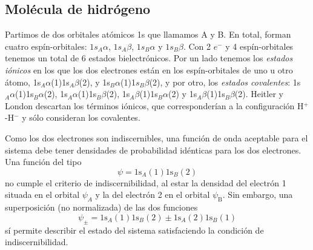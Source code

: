 \subsection{Molécula de hidrógeno}
Partimos de dos orbitales atómicos 1s que llamamos A y B.
En total, forman cuatro espín-orbitales: $1s_A\alpha$, 
$1s_A \beta$, $1s_B\alpha$ y $1s_B \beta$. 
Con 2 $e^-$ y 4 espín-orbitales tenemos un total de 6 estados
bielectrónicos. Por un lado tenemos los \textit{estados 
iónicos} en los que los dos electrones  están en los
espín-orbitales de uno u otro átomo, 
1s$_A\alpha$(1)1s$_A\beta$(2),
y 1s$_B\alpha$(1)1$s_B\beta$(2), 
y por otro, los \textit{estados covalentes}:
1s$_A\alpha$(1)1s$_B\alpha$(2), 1s$_A\alpha$(1)1s$_B\beta$(2), 
1s$_A\beta$(1)1s$_B\alpha$(2) y 1s$_A\beta$(1)1s$_B\beta$(2).
Heitler y London descartan los términos iónicos, que 
corresponderían a la configuración H$^+$-H$^-$ y sólo 
consideran los covalentes.

Como los dos electrones son indiscernibles, una función de onda
aceptable para el sistema debe tener densidades de probabilidad 
idénticas para los dos electrones. Una función del tipo
\begin{equation}
    \psi=\mathrm{1s}_A(1)\mathrm{1s}_B(2)
\end{equation}
no cumple el criterio de indiscernibilidad, al estar la densidad
del electrón 1 situada en el orbital $\psi_A$ y la del electrón
2 en el orbital $\psi_\mathrm{B}$. Sin embargo, una
superposición (no normalizada) de las dos funciones 
\begin{equation}
    \psi_\pm=\mathrm{1s}_A(1)\mathrm{1s}_B(2) \pm
    \mathrm{1s}_A(2)\mathrm{1s}_B(1)
\end{equation}
sí permite describir el estado del sistema satisfaciendo la 
condición de indiscernibilidad. 

